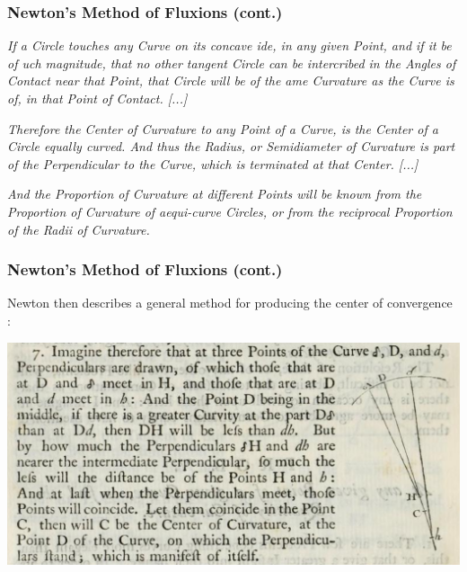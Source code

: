 \documentclass{beamer}
\theoremstyle{definition}
\begin{document}
\begin{frame}
    \frametitle{Newton's Method of Fluxions (cont.)}

    \textit{If a Circle touches any Curve on its concave \textesh{}ide, in any given Point,
        and if it be of \textesh{}uch magnitude, that no other tangent Circle can be
        inter\textesh{}cribed in the Angles of Contact near that Point, that Circle
        will be of the \textesh{}ame Curvature as the Curve is of, in that Point of
        Contact. [...]
    }

    \textit{Therefore the Center of Curvature to any Point of a Curve, is the Center of a
        Circle equally curved. And thus the Radius, or Semidiameter of Curvature is
        part of the Perpendicular to the Curve, which is terminated at that Center.
        [...]
    }

    \textit{And the Proportion of Curvature at different Points will be known from
        the Proportion of Curvature of aequi-curve Circles, or from the reciprocal
        Proportion of the Radii of Curvature.
    }
\end{frame}

\begin{frame}
    \frametitle{Newton's Method of Fluxions (cont.)}

    Newton then describes a general method for producing the center of convergence \cite{newton}:

    \includegraphics[width=\textwidth]{images/newton-center-construction.png}

\end{frame}
\end{document}
